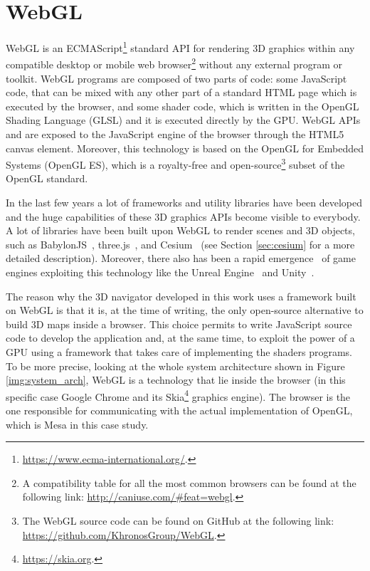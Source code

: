 \section{WebGL} \label{sec:webgl}
WebGL is an ECMAScript\footnote{\url{https://www.ecma-international.org/}.}
standard API for rendering 3D graphics within any compatible
desktop or mobile web browser\footnote{A compatibility table for all the most
common browsers can be found at the following link: \url{http://caniuse.com/#feat=webgl}.}
without any external program or toolkit. WebGL programs are composed of two parts
of code: some JavaScript code, that can be mixed with any other part of a standard
HTML page which is executed by the browser, and some shader code, which is written 
in the OpenGL Shading Language (GLSL) and it is executed directly by the GPU.
WebGL APIs and are exposed to the JavaScript engine of the browser through the
HTML5 canvas element. Moreover, this technology is based on the OpenGL for Embedded
Systems (OpenGL ES), which is a royalty-free and open-source\footnote{The WebGL source
code can be found on GitHub at the following link: \url{https://github.com/KhronosGroup/WebGL}.}
subset of the OpenGL standard.

In the last few years a lot of frameworks and utility libraries have been developed
and the huge capabilities of these 3D graphics APIs become visible to everybody.
A lot of libraries have been built upon WebGL to render scenes and 3D objects, such
as BabylonJS~\cite{babylon3d}, three.js~\cite{cabello2010three}, and 
Cesium~\cite{cozzi20113d} (see Section \ref{sec:cesium} for a more detailed description).
Moreover, there also has been a rapid emergence~\cite{parisi2014programming} of
game engines exploiting this technology like the Unreal Engine~\cite{games2007unreal}
and Unity~\cite{engine9unity}.

The reason why the 3D navigator developed in this work uses a framework built on
WebGL is that it is, at the time of writing, the only open-source alternative to
build 3D maps inside a browser. This choice permits to write JavaScript source
code to develop the application and, at the same time, to exploit the power of
a GPU using a framework that takes care of implementing the shaders programs.
To be more precise, looking at the whole system architecture shown in Figure
\ref{img:system_arch}, WebGL is a technology that lie inside the browser
(in this specific case Google Chrome and its Skia\footnote{\url{https://skia.org}.}
graphics engine). The browser is the one responsible for communicating with
the actual implementation of OpenGL, which is Mesa in this case study.


